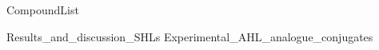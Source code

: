 \documentclass[10pt,a4paper]{article}
\begin{document}
	

{CompoundList}





{Results_and_discussion_SHLs}
\newpage
{Experimental_AHL_analogue_conjugates}

\newpage
{}


\listoftodos
\end{document}
